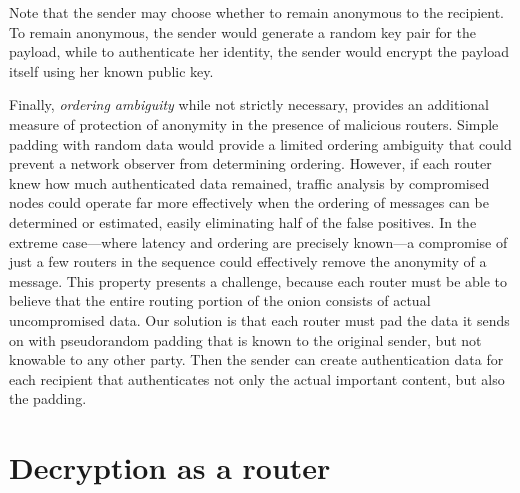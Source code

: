 \documentclass[letterpaper,twocolumn,amsmath,amssymb,pre,aps,10pt]{revtex4-1}
\begin{document}
Note that the sender may choose whether to remain anonymous to the
recipient.  To remain anonymous, the sender would generate a random
key pair for the payload, while to authenticate her identity, the
sender would encrypt the payload itself using her known public key.

Finally, \emph{ordering ambiguity} while not strictly necessary,
provides an additional measure of protection of anonymity in the
presence of malicious routers.  Simple padding with random data would
provide a limited ordering ambiguity that could prevent a network
observer from determining ordering.  However, if each router knew how
much authenticated data remained, traffic analysis by compromised
nodes could operate far more effectively when the ordering of messages
can be determined or estimated, easily eliminating half of the false
positives.  In the extreme case---where latency and ordering are
precisely known---a compromise of just a few routers in the sequence
could effectively remove the anonymity of a message.  This property
presents a challenge, because each router must be able to believe that
the entire routing portion of the onion consists of actual
uncompromised data.  Our solution is that each router must pad the
data it sends on with pseudorandom padding that is known to the
original sender, but not knowable to any other party.  Then the sender
can create authentication data for each recipient that authenticates
not only the actual important content, but also the padding.

\section{Decryption as a router}
\end{document}
